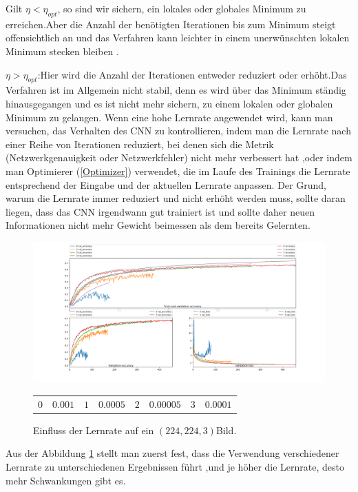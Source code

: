 \documentclass[12pt,a4paper]{scrartcl}
\numberwithin{equation}{section}
\begin{document}
Gilt {$ \eta < \eta_{opt} $}, so sind wir sichern, ein lokales oder globales Minimum zu erreichen.Aber die Anzahl der benötigten Iterationen bis zum Minimum steigt offensichtlich an und das Verfahren kann leichter in einem unerwünschten lokalen Minimum stecken bleiben .

{$ \eta > \eta_{opt} $}:Hier wird die Anzahl der Iterationen entweder reduziert oder erhöht.Das  Verfahren ist im Allgemein nicht stabil, denn es wird über das Minimum ständig hinausgegangen und es ist nicht mehr sichern, zu einem lokalen oder globalen Minimum zu gelangen.  Wenn eine hohe Lernrate angewendet wird, kann man versuchen, das Verhalten des \ac{CNN} zu kontrollieren, indem man die Lernrate nach einer Reihe von Iterationen reduziert, bei denen sich die Metrik (Netzwerkgenauigkeit oder Netzwerkfehler) nicht mehr verbessert hat ,oder indem man Optimierer (\ref{Optimizer}) verwendet, die im Laufe des Trainings die Lernrate entsprechend der Eingabe und der aktuellen Lernrate anpassen. Der Grund, warum die Lernrate immer reduziert und nicht erhöht werden muss, sollte daran liegen, dass das \ac{CNN} irgendwann gut trainiert ist und sollte daher neuen Informationen nicht mehr Gewicht  beimessen als dem bereits Gelernten.


\begin{figure}[h!]
	\includegraphics[width=\linewidth]{LearningRate}
	\begin{center}
		\begin{tabular}{r@{: }l r@{: }l r@{: }l r@{: }l}
			$0$ & $ 0.001 $ &$ 1$& $ 0.0005 $ &	$ 2 $ & $ 0.00005 $ &$3$ & $ 0.0001 $
		\end{tabular}
		
	\end{center}
	\caption{Einfluss der Lernrate auf ein $ (224,224,3) $Bild.}
	\label{fig:Lernrate}
\end{figure}

Aus der Abbildung \ref{fig:Lernrate} stellt man zuerst fest, dass die Verwendung verschiedener Lernrate zu unterschiedenen Ergebnissen führt ,und je höher die Lernrate, desto mehr Schwankungen gibt es.
\end{document}
